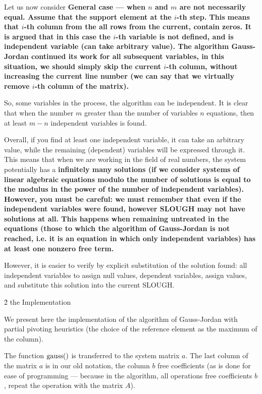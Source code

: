 Let us now consider \bf{General case} --- when $n$ and $m$ are not necessarily equal. Assume that the support element at the $i$-th step. This means that $i$-th column from the all rows from the current, contain zeros. It is argued that in this case the $i$-th variable is not defined, and is \bf{independent variable} (can take arbitrary value). The algorithm Gauss-Jordan continued its work for all subsequent variables, in this situation, we should simply skip the current $i$-th column, without increasing the current line number (we can say that we virtually remove $i$-th column of the matrix).

So, some variables in the process, the algorithm can be independent. It is clear that when the number $m$ greater than the number of variables $n$ equations, then at least $m-n$ independent variables is found.

Overall, if you find at least one independent variable, it can take an arbitrary value, while the remaining (dependent) variables will be expressed through it. This means that when we are working in the field of real numbers, the system potentially has a \bf{infinitely many solutions} (if we consider systems of linear algebraic equations modulo the number of solutions is equal to the modulus in the power of the number of independent variables). However, you must be careful: we must remember that even if the independent variables were found, however SLOUGH \bf{may not have solutions at all}. This happens when remaining untreated in the equations (those to which the algorithm of Gauss-Jordan is not reached, i.e. it is an equation in which only independent variables) has at least one nonzero free term.

However, it is easier to verify by explicit substitution of the solution found: all independent variables to assign null values, dependent variables, assign values, and substitute this solution into the current SLOUGH.



\h2{ the Implementation }

We present here the implementation of the algorithm of Gauss-Jordan with partial pivoting heuristics (the choice of the reference element as the maximum of the column).

The function $\rm gauss()$ is transferred to the system matrix $a$. The last column of the matrix $a$ is in our old notation, the column $b$ free coefficients (as is done for ease of programming --- because in the algorithm, all operations free coefficients $b$, repeat the operation with the matrix $A$).

